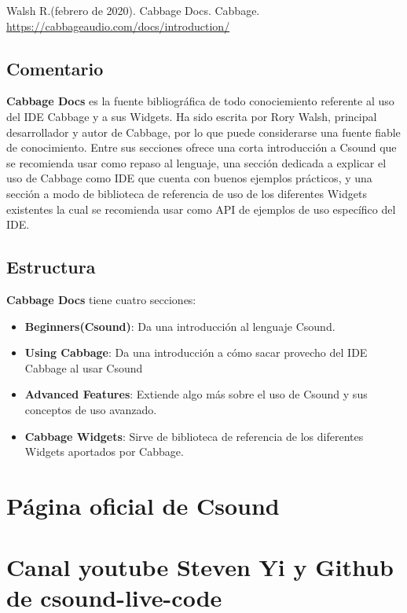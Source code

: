 Walsh R.(febrero de 2020). Cabbage Docs. Cabbage. \url{https://cabbageaudio.com/docs/introduction/}

\subsection{Comentario}

\textbf{Cabbage Docs} es la fuente bibliográfica de todo conociemiento referente al uso del IDE Cabbage y a sus Widgets. Ha sido escrita por Rory Walsh, principal desarrollador y autor de Cabbage, por lo que puede considerarse una fuente fiable de conocimiento.
Entre sus secciones ofrece una corta introducción a Csound que se recomienda usar como repaso al lenguaje, una sección dedicada a explicar el uso de Cabbage como IDE que cuenta con buenos ejemplos prácticos, y una sección a modo de biblioteca de referencia de uso de los diferentes Widgets existentes la cual se recomienda usar como API de ejemplos de uso específico del IDE.

\subsection{Estructura}

\textbf{Cabbage Docs} tiene cuatro secciones:
 \begin{itemize}
 \item \textbf{Beginners(Csound)}: Da una introducción al lenguaje Csound.
 
 \item \textbf{Using Cabbage}: Da una introducción a cómo sacar provecho del IDE Cabbage al usar Csound
 
 \item \textbf{Advanced Features}: Extiende algo más sobre el uso de Csound y sus conceptos de uso avanzado.
 
 \item \textbf{Cabbage Widgets}: Sirve de biblioteca de referencia de los diferentes Widgets aportados por Cabbage.
 \end{itemize} 
 
\section{Página oficial de Csound}
 
\section{Canal youtube Steven Yi y Github de csound-live-code}
